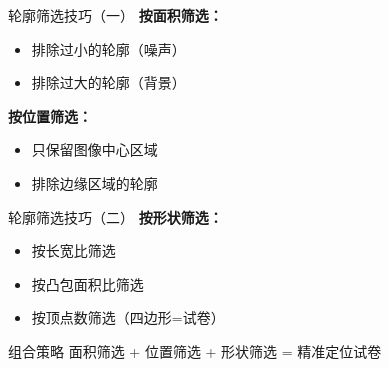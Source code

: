 \begin{frame}{轮廓筛选技巧（一）}
    \textbf{按面积筛选：}
    \begin{itemize}
        \item 排除过小的轮廓（噪声）
        \item 排除过大的轮廓（背景）
    \end{itemize}

    \textbf{按位置筛选：}
    \begin{itemize}
        \item 只保留图像中心区域
        \item 排除边缘区域的轮廓
    \end{itemize}
\end{frame}

\begin{frame}{轮廓筛选技巧（二）}
    \textbf{按形状筛选：}
    \begin{itemize}
        \item 按长宽比筛选
        \item 按凸包面积比筛选
        \item 按顶点数筛选（四边形=试卷）
    \end{itemize}

    \vspace{0.4cm}

    \begin{block}{组合策略}
        面积筛选 + 位置筛选 + 形状筛选 = 精准定位试卷
    \end{block}
\end{frame}

